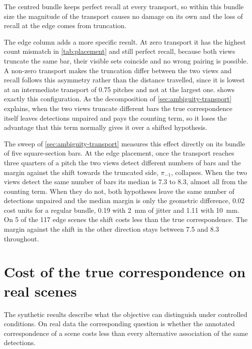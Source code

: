 \documentclass[a4paper, 12pt, twoside]{book}
\begin{document}
The centred bundle keeps perfect recall at every transport, so within this bundle size the magnitude of the transport causes no damage on its own and the loss of recall at the edge comes from truncation.

The edge column adds a more specific result. At zero transport it has the highest count mismatch in \cref{tab:placement} and still perfect recall, because both views truncate the same bar, their visible sets coincide and no wrong pairing is possible. A non-zero transport makes the truncation differ between the two views and recall follows this asymmetry rather than the distance travelled, since it is lowest at an intermediate transport of 0.75 pitches and not at the largest one.  shows exactly this configuration. As the decomposition of \cref{sec:ambiguity-transport} explains, when the two views truncate different bars the true correspondence itself leaves detections unpaired and pays the counting term, so it loses the advantage that this term normally gives it over a shifted hypothesis.

The sweep of \cref{sec:ambiguity-transport} measures this effect directly on its bundle of five square-section bars. At the edge placement, once the transport reaches three quarters of a pitch the two views detect different numbers of bars and the margin against the shift towards the truncated side, $\pi_{-1}$, collapses. When the two views detect the same number of bars its median is 7.3 to 8.3, almost all from the counting term. When they do not, both hypotheses leave the same number of detections unpaired and the median margin is only the geometric difference, 0.02 cost units for a regular bundle, 0.19 with 2~mm of jitter and 1.11 with 10~mm. On 5 of the 117 edge scenes the shift costs less than the true correspondence. The margin against the shift in the other direction stays between 7.5 and 8.3 throughout.

\section{Cost of the true correspondence on real scenes}
\label{sec:ambiguity-real}

The synthetic results describe what the objective can distinguish under controlled conditions. On real data the corresponding question is whether the annotated correspondence of a scene costs less than every alternative association of the same detections.
\end{document}
